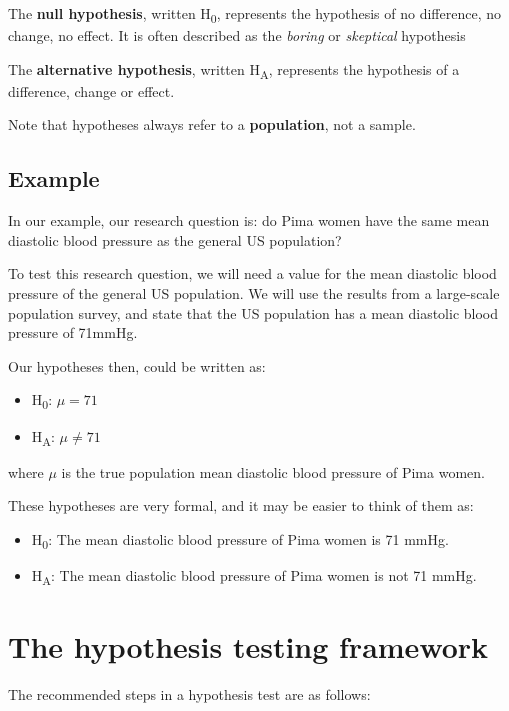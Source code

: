 \documentclass[
  a4paper,
]{memoir}
\providecommand{\tightlist}{%
  \setlength{\itemsep}{0pt}\setlength{\parskip}{0pt}}
\begin{document}
The \textbf{null hypothesis}, written H\textsubscript{0}, represents the
hypothesis of no difference, no change, no effect. It is often described
as the \emph{boring} or \emph{skeptical} hypothesis

The \textbf{alternative hypothesis}, written H\textsubscript{A},
represents the hypothesis of a difference, change or effect.

Note that hypotheses always refer to a \textbf{population}, not a
sample.

\subsection{Example}\label{example}

In our example, our research question is: do Pima women have the same
mean diastolic blood pressure as the general US population?

To test this research question, we will need a value for the mean
diastolic blood pressure of the general US population. We will use the
results from a large-scale population survey, and state that the US
population has a mean diastolic blood pressure of 71mmHg.

Our hypotheses then, could be written as:

\begin{itemize}
\tightlist
\item
  H\textsubscript{0}: \(\mu = 71\)
\item
  H\textsubscript{A}: \(\mu \ne 71\)
\end{itemize}

where \(\mu\) is the true population mean diastolic blood pressure of
Pima women.

These hypotheses are very formal, and it may be easier to think of them
as:

\begin{itemize}
\tightlist
\item
  H\textsubscript{0}: The mean diastolic blood pressure of Pima women is
  71 mmHg.
\item
  H\textsubscript{A}: The mean diastolic blood pressure of Pima women is
  not 71 mmHg.
\end{itemize}

\section{The hypothesis testing
framework}\label{the-hypothesis-testing-framework}

The recommended steps in a hypothesis test are as follows:
\end{document}
